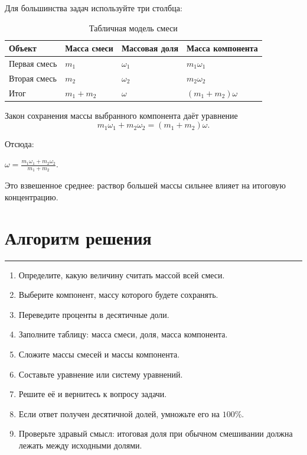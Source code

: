 \documentclass[a4paper,12pt]{article}
\newcommand{\sectionline}{%
  \par\vspace{2pt}
  {\color{accent}\rule{\linewidth}{0.7pt}}
  \vspace{4pt}
}
\newcommand{\formula}[1]{%
  \begin{center}
    \begin{minipage}{0.9\linewidth}
      \centering\large\color{darkaccent}#1
    \end{minipage}
  \end{center}
}
\begin{document}
Для большинства задач используйте три столбца:

\begin{table}[h]
\centering
\caption{Табличная модель смеси}
\begin{tabularx}{\linewidth}{@{}lXXX@{}}
\toprule
Объект & Масса смеси & Массовая доля & Масса компонента \\
\midrule
Первая смесь  & $m_1$ & $\omega_1$ & $m_1\omega_1$ \\
Вторая смесь & $m_2$ & $\omega_2$ & $m_2\omega_2$ \\
Итог         & $m_1+m_2$ & $\omega$ & $(m_1+m_2)\omega$ \\
\bottomrule
\end{tabularx}
\end{table}

Закон сохранения массы выбранного компонента даёт уравнение
\[
  m_1\omega_1+m_2\omega_2=(m_1+m_2)\omega.
\]

Отсюда:
\formula{
  $\displaystyle
  \omega=\frac{m_1\omega_1+m_2\omega_2}{m_1+m_2}$.
}

Это взвешенное среднее: раствор большей массы сильнее влияет на итоговую
концентрацию.

\section{Алгоритм решения}
\sectionline

\begin{enumerate}[leftmargin=8mm,label=\textbf{\arabic*.}]
  \item Определите, какую величину считать массой всей смеси.
  \item Выберите компонент, массу которого будете сохранять.
  \item Переведите проценты в десятичные доли.
  \item Заполните таблицу: масса смеси, доля, масса компонента.
  \item Сложите массы смесей и массы компонента.
  \item Составьте уравнение или систему уравнений.
  \item Решите её и вернитесь к вопросу задачи.
  \item Если ответ получен десятичной долей, умножьте его на $100\%$.
  \item Проверьте здравый смысл: итоговая доля при обычном смешивании должна
        лежать между исходными долями.
\end{enumerate}
\end{document}
